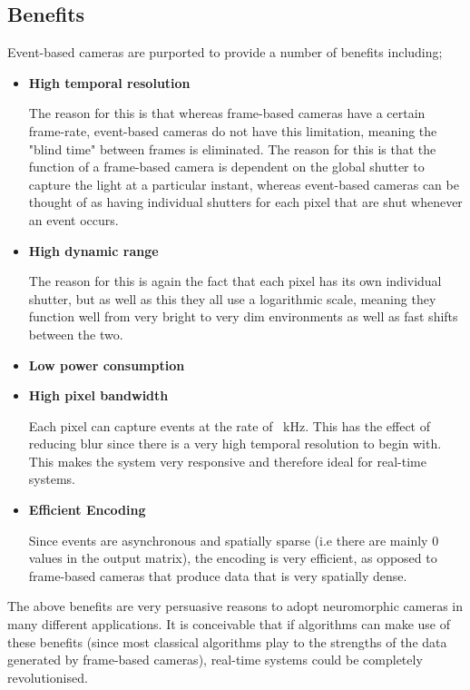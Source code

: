 \subsection{Benefits} \label{ssec:event_camera_benefits}
Event-based cameras are purported to provide a number of benefits including;

\begin{itemize}
      \item \textbf{High temporal resolution}

            The reason for this is that whereas frame-based cameras have a certain frame-rate, event-based cameras do not have this limitation, meaning the "blind time" between frames is eliminated. The reason for this is that the function of a frame-based camera is dependent on the global shutter to capture the light at a particular instant, whereas event-based cameras can be thought of as having individual shutters for each pixel that are shut whenever an event occurs.
      \item \textbf{High dynamic range}

            The reason for this is again the fact that each pixel has its own individual shutter, but as well as this they all use a logarithmic scale, meaning they function well from very bright to very dim environments as well as fast shifts between the two.
      \item \textbf{Low power consumption}
      \item \textbf{High pixel bandwidth}

            Each pixel can capture events at the rate of ~kHz. This has the effect of reducing blur since there is a very high temporal resolution to begin with. This makes the system very responsive and therefore ideal for real-time systems.
      \item \textbf{Efficient Encoding}

            Since events are asynchronous and spatially sparse (i.e there are mainly 0 values in the output matrix), the encoding is very efficient, as opposed to frame-based cameras that produce data that is very spatially dense.
\end{itemize}

The above benefits are very persuasive reasons to adopt neuromorphic cameras in many different applications. It is conceivable that if algorithms can make use of these benefits (since most classical algorithms play to the strengths of the data generated by frame-based cameras), real-time systems could be completely revolutionised.

